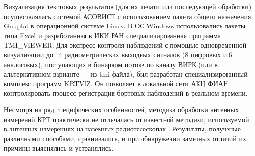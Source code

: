 Визуализация текстовых результатов (для их печати или последующей
обработки) осуществлялась системой АСОВИСТ с использованием пакета
общего назначения Gnuplot в операционной системе Linux.
В ОС Windows использовались пакеты типа Excel и разработанная в
ИКИ РАН специализированная программа TMI\_VIEWER.
Для экспресс-контроля наблюдений с помощью одновременной визуализации
до 14 радиометрических выходных сигналов (8 цифровых и 6 аналоговых),
поступающих в бинарном потоке по каналу ВИРК (или  в альтернативном
варианте  --- из tmi-файла), был разработан специализированный комплекс
программ KRTVIZ. Он позволяет в локальной сети АКЦ ФИАН контролировать
процесс регистрации бортовых наблюдений в реальном времени.

Несмотря на ряд специфических особенностей, методика обработки
антенных измерений КРТ практически не отличалась от известной методики,
используемой в антенных измерениях на наземных радиотелескопах
 \cite{}. Результаты, полученые различными способами,
сравнивались, и при обнаружении заметных отличий их причины
выяснялись и устранялись.


